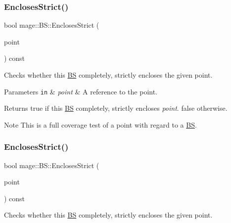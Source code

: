\subsubsection{\texorpdfstring{Encloses\+Strict()}{EnclosesStrict()}\hspace{0.1cm}{\footnotesize\ttfamily [1/4]}}
{\footnotesize\ttfamily bool mage\+::\+B\+S\+::\+Encloses\+Strict (\begin{DoxyParamCaption}\item[{const \hyperlink{structmage_1_1_point3}{Point3} \&}]{point }\end{DoxyParamCaption}) const\hspace{0.3cm}{\ttfamily [noexcept]}}

Checks whether this \hyperlink{structmage_1_1_b_s}{BS} completely, strictly encloses the given point.


\begin{DoxyParams}[1]{Parameters}
\mbox{\tt in}  & {\em point} & A reference to the point. \\
\hline
\end{DoxyParams}
\begin{DoxyReturn}{Returns}
{\ttfamily true} if this \hyperlink{structmage_1_1_b_s}{BS} completely, strictly encloses {\itshape point}. {\ttfamily false} otherwise. 
\end{DoxyReturn}
\begin{DoxyNote}{Note}
This is a full coverage test of a point with regard to a \hyperlink{structmage_1_1_b_s}{BS}. 
\end{DoxyNote}
\hypertarget{structmage_1_1_b_s_abe3c13f8a9aa74199b38eff5bb3fd141}{}\label{structmage_1_1_b_s_abe3c13f8a9aa74199b38eff5bb3fd141} 
\subsubsection{\texorpdfstring{Encloses\+Strict()}{EnclosesStrict()}\hspace{0.1cm}{\footnotesize\ttfamily [2/4]}}
{\footnotesize\ttfamily bool mage\+::\+B\+S\+::\+Encloses\+Strict (\begin{DoxyParamCaption}\item[{F\+X\+M\+V\+E\+C\+T\+OR}]{point }\end{DoxyParamCaption}) const\hspace{0.3cm}{\ttfamily [noexcept]}}

Checks whether this \hyperlink{structmage_1_1_b_s}{BS} completely, strictly encloses the given point.


